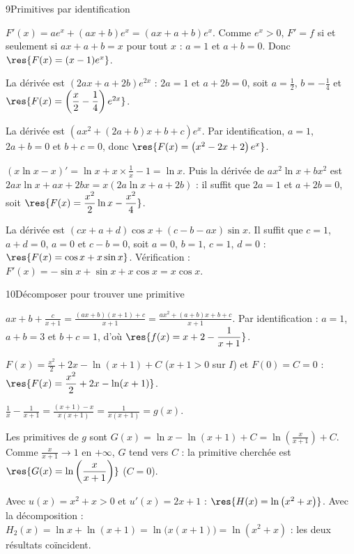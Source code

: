 \begin{corrige}{9}{Primitives par identification}
\begin{questions}
  \item $F'(x)=ae^{x}+(ax+b)e^{x}=(ax+a+b)e^{x}$. Comme $e^{x}>0$, $F'=f$ si et seulement si $ax+a+b=x$ pour tout $x$ :
    $a=1$ et $a+b=0$. Donc $\res{F(x)=(x-1)e^{x}}$.
  \item La dérivée est $(2ax+a+2b)e^{2x}$ : $2a=1$ et $a+2b=0$, soit $a=\frac12$, $b=-\frac14$ et $\res{F(x)=\left(\dfrac x2-\dfrac14\right)e^{2x}}$.
  \item La dérivée est $\left(ax^{2}+(2a+b)x+b+c\right)e^{x}$. Par identification, $a=1$, $2a+b=0$ et $b+c=0$, donc
    $\res{F(x)=\left(x^{2}-2x+2\right)e^{x}}$.
  \item $(x\ln x-x)'=\ln x+x\times\frac1x-1=\ln x$. Puis la dérivée de $ax^{2}\ln x+bx^{2}$ est $2ax\ln x+ax+2bx=x\left(2a\ln x+a+2b\right)$ :
    il suffit que $2a=1$ et $a+2b=0$, soit $\res{F(x)=\dfrac{x^{2}}{2}\ln x-\dfrac{x^{2}}{4}}$.
  \item La dérivée est $(cx+a+d)\cos x+(c-b-ax)\sin x$. Il suffit que $c=1$, $a+d=0$, $a=0$ et $c-b=0$, soit $a=0$, $b=1$,
    $c=1$, $d=0$ : $\res{F(x)=\cos x+x\sin x}$. Vérification : $F'(x)=-\sin x+\sin x+x\cos x=x\cos x$.
\end{questions}
\end{corrige}

\begin{corrige}{10}{Décomposer pour trouver une primitive}
\begin{questions}
  \item $ax+b+\frac{c}{x+1}=\frac{(ax+b)(x+1)+c}{x+1}=\frac{ax^{2}+(a+b)x+b+c}{x+1}$. Par identification : $a=1$, $a+b=3$ et $b+c=1$,
    d'où $\res{f(x)=x+2-\dfrac{1}{x+1}}$.
  \item $F(x)=\frac{x^{2}}{2}+2x-\ln(x+1)+C$ ($x+1>0$ sur $I$) et $F(0)=C=0$ : $\res{F(x)=\dfrac{x^{2}}{2}+2x-\ln(x+1)}$.
\end{questions}
\begin{questions}[resume]
  \item $\frac1x-\frac{1}{x+1}=\frac{(x+1)-x}{x(x+1)}=\frac{1}{x(x+1)}=g(x)$.
  \item Les primitives de $g$ sont $G(x)=\ln x-\ln(x+1)+C=\ln\left(\frac{x}{x+1}\right)+C$. Comme $\frac{x}{x+1}\to1$ en $+\infty$, $G$ tend
    vers $C$ : la primitive cherchée est $\res{G(x)=\ln\left(\dfrac{x}{x+1}\right)}$ ($C=0$).
  \item Avec $u(x)=x^{2}+x>0$ et $u'(x)=2x+1$ : $\res{H(x)=\ln\left(x^{2}+x\right)}$. Avec la décomposition :
    $H_2(x)=\ln x+\ln(x+1)=\ln\big(x(x+1)\big)=\ln\left(x^{2}+x\right)$ : les deux résultats coïncident.
\end{questions}
\end{corrige}

